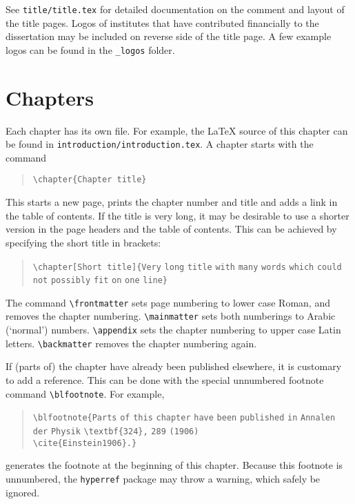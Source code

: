 \begin{refsection}
See \texttt{title/title.tex} for detailed documentation on the comment and layout of the title pages. Logos of institutes that have contributed financially to the dissertation may be included on reverse side of the title page. A few example logos can be found in the \verb|_logos| folder.

\section{Chapters}

\dropcap E{ach} chapter has its own file. For example, the \LaTeX{} source of this chapter can be found in \texttt{introduction/introduc\-tion\allowbreak.tex}. A chapter starts with the command

\begin{quote}
\verb|\chapter{Chapter title}|
\end{quote}
This starts a new page, prints the chapter number and title and adds a link in the table of contents. If the title is very long, it may be desirable to use a shorter version in the page headers and the table of contents. This can be achieved by specifying the short title in brackets:

\begin{quote}
\verb|\chapter[Short title]{Very| \verb|long| \verb|title| \verb|with| \verb|many| \verb|words| \verb|which| \verb|could| \verb|not| \verb|possibly| \verb|fit| \verb|on| \verb|one| \verb|line}|
\end{quote}
The command \verb|\frontmatter| sets page numbering to lower case Roman, and removes the chapter numbering. \verb|\mainmatter| sets both numberings to Arabic (`normal') numbers. \verb|\appendix| sets the chapter numbering to upper case Latin letters. \verb|\backmatter| removes the chapter numbering again.

If (parts of) the chapter have already been published elsewhere, it is customary to add a reference. This can be done with the special unnumbered footnote command \verb|\blfootnote|. For example,

\begin{quote}
\verb|\blfootnote{Parts| \verb|of| \verb|this| \verb|chapter| \verb|have| \verb|been| \verb|published| \verb|in| \verb|Annalen| \verb|der| \verb|Physik| \verb|\textbf{324},| \verb|289| \verb|(1906)|\\\verb|\cite{Einstein1906}.}|
\end{quote}
generates the footnote at the beginning of this chapter. Because this footnote is unnumbered, the \texttt{hyperref} package may throw a warning, which safely be ignored.


\end{refsection}
